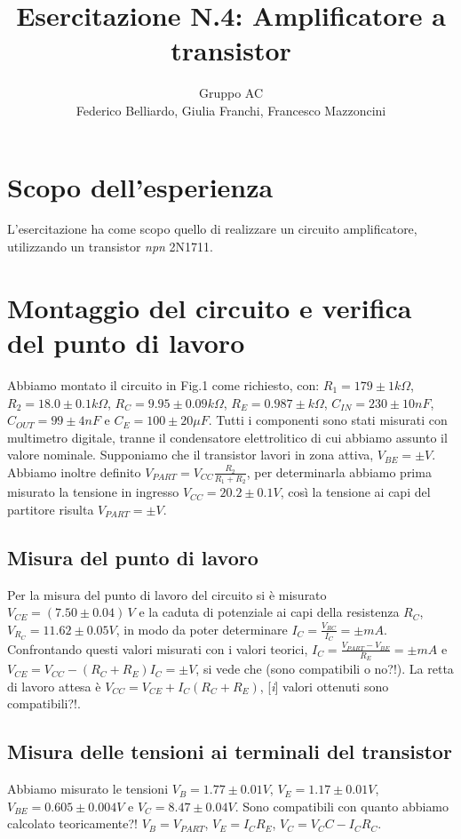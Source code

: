 \documentclass[10pt,a4paper]{article}
\author{Gruppo AC \\ Federico Belliardo, Giulia Franchi, Francesco Mazzoncini}
\title{Esercitazione N.4: Amplificatore a transistor}
\newcommand{\rem}[1]{[\emph{#1}]}
\begin{document}
\maketitle

\section{Scopo dell'esperienza}
L'esercitazione ha come scopo quello di realizzare un circuito amplificatore, utilizzando un transistor \textit{npn} 2N1711.

\section{Montaggio del circuito e verifica del punto di lavoro}
Abbiamo montato il circuito in Fig.1 come richiesto, con: $R_1= 179\pm1  k\Omega$, $R_2= 18.0\pm0.1  k\Omega$, $R_C= 9.95\pm 0.09  k\Omega$, $R_E= 0.987\pm  k\Omega$, $C_{IN}= 230\pm10  nF$, $C_{OUT}= 99\pm4  nF$ e $C_E= 100\pm20  \mu F$. Tutti i componenti sono stati misurati con multimetro digitale, tranne il condensatore elettrolitico di cui abbiamo assunto il valore nominale.
Supponiamo che il transistor lavori in zona attiva, $V_{BE}= \pm V$. Abbiamo inoltre definito $V_{PART}=V_{CC}\frac{R_2}{R_1+R_2}$, per determinarla abbiamo prima misurato la tensione in ingresso $V_{CC}= 20.2\pm0.1 V$, così la tensione ai capi del partitore risulta $V_{PART}= \pm V$.


\subsection{Misura del punto di lavoro}
Per la misura del punto di lavoro del circuito si è misurato $V_{CE}= (7.50\pm0.04)\,V$ e la caduta di potenziale ai capi della resistenza $R_C$, $V_{R_C}= 11.62\pm0.05  V$, in modo da poter determinare $I_C=\frac{V_{RC}}{I_C}= \pm mA$.
Confrontando questi valori misurati con i valori teorici, $I_C=\frac{V_{PART}-V_{BE}}{R_E}= \pm mA$ e $V_{CE}=V_{CC}-(R_C+R_E)I_C= \pm V$, si vede che (sono compatibili o no?!).
La retta di lavoro attesa è $V_{CC}=V_{CE}+I_C(R_C+R_E)$, \rem i valori ottenuti sono compatibili?!.

\subsection{Misura delle tensioni ai terminali del transistor}
Abbiamo misurato le tensioni $V_B= 1.77\pm0.01  V$, $V_E= 1.17\pm0.01 V$, $V_{BE}= 0.605\pm0.004  V$ e $V_C= 8.47\pm0.04 V$. Sono compatibili con quanto abbiamo calcolato teoricamente?! $V_B= V_{PART}$, $V_E=I_C R_E$, $V_C=V_CC-I_C R_C$.
\end{document}
